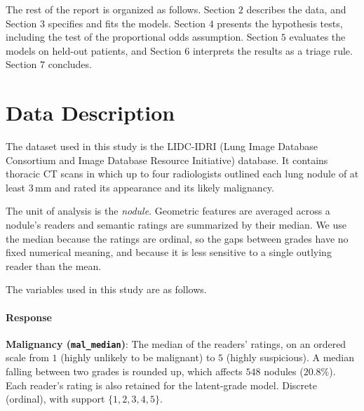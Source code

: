 \documentclass[12pt]{article}
\begin{document}
The rest of the report is organized as follows. Section $2$ describes the data, and
Section $3$ specifies and fits the models. Section $4$ presents the hypothesis tests,
including the test of the proportional odds assumption. Section $5$ evaluates the
models on held-out patients, and Section $6$ interprets the results as a triage
rule. Section $7$ concludes.

\section{Data Description}

The dataset used in this study is the LIDC-IDRI (Lung Image
Database Consortium and Image Database Resource Initiative)
database\cite{armato2011lidc}.
It contains thoracic CT scans in which up to four radiologists
outlined each lung nodule of at least $3$\,mm and rated its
appearance and its likely malignancy.

The unit of analysis is the \emph{nodule}. Geometric features are
averaged across a nodule's readers and semantic ratings are
summarized by their median. We use the median because the ratings
are ordinal, so the gaps between grades have no fixed numerical
meaning, and because it is less sensitive to a single outlying
reader than the mean.

The variables used in this study are as follows.

\paragraph{Response}
\begin{itemize}
    \ii \textbf{Malignancy (\texttt{mal\_median})}:
    The median of the readers' ratings, on an ordered scale from
    $1$ (highly unlikely to be malignant) to $5$
    (highly suspicious). A median falling between two grades is
    rounded up, which affects $548$ nodules ($20.8\%$).
    Each reader's rating is also retained for the latent-grade model.
    Discrete (ordinal), with support $\{1, 2, 3, 4, 5\}$.
\end{itemize}
\end{document}
